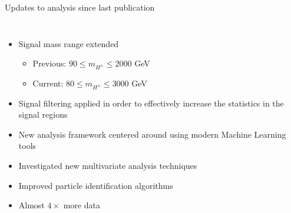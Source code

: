 \documentclass[aspectratio=169,xcolor=table]{beamer}
\begin{document}
    \begin{frame}[t]{Updates to analysis since last publication}
      \begin{columns}
        \begin{itemize}
          \item Signal mass range extended 
          \begin{itemize}
            \item Previous: $90 \leq m_{H^{\pm}} \leq 2000$ GeV
            \item Current:  $80 \leq m_{H^{\pm}} \leq 3000$ GeV
          \end{itemize}
          \item Signal filtering applied in order to effectively increase the statistics in the signal regions
          \item New analysis framework centered around using modern Machine Learning tools
          \item Investigated new multivariate analysis techniques
          \item Improved particle identification algorithms
          \item Almost $4\times$ more data
        \end{itemize}


\end{columns}
\end{frame}
\end{document}
